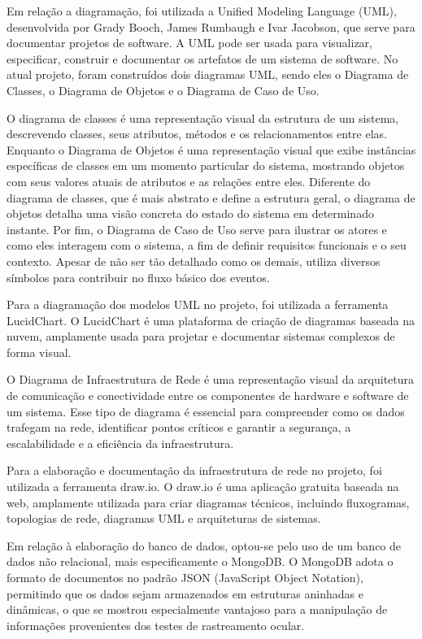 Em relação a diagramação, foi utilizada a Unified Modeling Language (UML), desenvolvida
por Grady Booch, James Rumbaugh e Ivar Jacobson, que serve para documentar projetos de
software. A UML pode ser usada para visualizar, especificar, construir e documentar os
artefatos de um sistema de software. No atual projeto, foram construídos dois diagramas
UML, sendo eles o Diagrama de Classes, o Diagrama de Objetos e o Diagrama de Caso de
Uso.

O diagrama de classes é uma representação visual da estrutura de um sistema, descrevendo
classes, seus atributos, métodos e os relacionamentos entre elas. Enquanto o Diagrama de
Objetos é uma representação visual que exibe instâncias específicas de classes em um
momento particular do sistema, mostrando objetos com seus valores atuais de atributos e as
relações entre eles. Diferente do diagrama de classes, que é mais abstrato e define a
estrutura geral, o diagrama de objetos detalha uma visão concreta do estado do sistema em
determinado instante. Por fim, o Diagrama de Caso de Uso serve para ilustrar os atores e
como eles interagem com o sistema, a fim de definir requisitos funcionais e o seu contexto.
Apesar de não ser tão detalhado como os demais, utiliza diversos símbolos para contribuir no
fluxo básico dos eventos.

Para a diagramação dos modelos UML no projeto, foi utilizada a ferramenta LucidChart. O
LucidChart é uma plataforma de criação de diagramas baseada na nuvem, amplamente
usada para projetar e documentar sistemas complexos de forma visual.

O Diagrama de Infraestrutura de Rede é uma representação visual da arquitetura de
comunicação e conectividade entre os componentes de hardware e software de um sistema.
Esse tipo de diagrama é essencial para compreender como os dados trafegam na rede,
identificar pontos críticos e garantir a segurança, a escalabilidade e a eficiência da
infraestrutura.

Para a elaboração e documentação da infraestrutura de rede no projeto, foi utilizada a
ferramenta draw.io. O draw.io é uma aplicação gratuita baseada na web, amplamente
utilizada para criar diagramas técnicos, incluindo fluxogramas, topologias de rede, diagramas
UML e arquiteturas de sistemas.

Em relação à elaboração do banco de dados, optou-se pelo uso de um banco de dados não
relacional, mais especificamente o MongoDB. O MongoDB adota o formato de documentos
no padrão JSON (JavaScript Object Notation), permitindo que os dados sejam armazenados
em estruturas aninhadas e dinâmicas, o que se mostrou especialmente vantajoso para a
manipulação de informações provenientes dos testes de rastreamento ocular.

